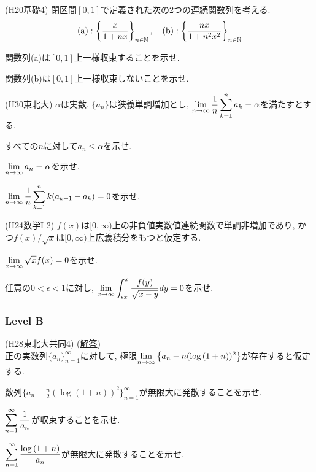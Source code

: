 \begin{prob} (H20基礎4) \label{prob:H20B4}
閉区間$[0,1]$で定義された次の2つの連続関数列を考える.
\[
\mathrm{(a)}: \left\{ \dfrac{x}{1+nx} \right\}_{n\in \mathbb{N}},\quad  \mathrm{(b)}: \left\{ \dfrac{nx}{1+n^2x^2} \right\}_{n\in \mathbb{N}}
\]
\ben
\item 関数列(a)は$[0,1]$上一様収束することを示せ.
\item 関数列(b)は$[0,1]$上一様収束しないことを示せ.
\een
\end{prob}

\begin{prob} (H30東北大)
$\alpha$は実数, $\{ a_n \}$は狭義単調増加とし, $\displaystyle\lim_{n\to \infty} \dfrac{1}{n} \displaystyle\sum_{k=1}^{n} a_k = \alpha$を満たすとする.
\ben
\item すべての$n$に対して$a_n \leq \alpha$を示せ.
\item $\displaystyle\lim_{n\to \infty} a_n = \alpha$を示せ.
\item $\displaystyle\lim_{n\to \infty} \dfrac{1}{n}\displaystyle\sum_{k=1}^{n}k(a_{k+1} - a_k) = 0$を示せ.
\een
\end{prob}

\begin{prob} (H24数学I-2) \label{prob:H24-I-2}
$f(x)$は$[0,\infty)$上の非負値実数値連続関数で単調非増加であり, かつ$f(x)/\sqrt{x}$は$[0,\infty)$上広義積分をもつと仮定する.
\ben
\item $\displaystyle\lim_{x\to \infty}\sqrt{x} f(x) = 0$を示せ.
\item 任意の$0<\epsilon<1$に対し, $\displaystyle\lim_{x\to \infty} \int_{\epsilon x}^{x} \dfrac{f(y)}{\sqrt{x-y}}dy = 0$を示せ.
\een
\end{prob}



\subsubsection{Level B}
\begin{prob} (H28東北大共同4) (\href{https://drive.google.com/file/d/1anaTAHLXhDH8Ng_6pvw6pPFb4MDD5v7i/view?usp=sharing}{解答})\\
正の実数列$\{ a_n \}_{n=1}^{\infty}$に対して, 極限$\displaystyle\lim_{n\to \infty}\left\{ a_n - n(\log{(1+n)})^2 \right\}$が存在すると仮定する.
\ben
\item 数列$\{ a_n - \frac{n}{2}(\log{(1+n)})^2\}_{n=1}^{\infty}$が無限大に発散することを示せ.
\item $\displaystyle\sum_{n=1}^{\infty} \dfrac{1}{a_n}$が収束することを示せ.
\item $\displaystyle\sum_{n=1}^{\infty} \dfrac{\log{(1+n)}}{a_n}$が無限大に発散することを示せ.
\een
\end{prob}


